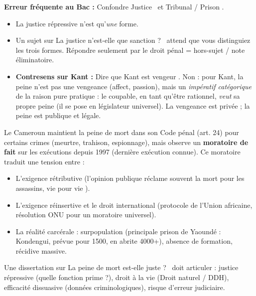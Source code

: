 \documentclass[11pt]{article}
\begin{document}
\begin{attention}
\textbf{Erreur fréquente au Bac :} Confondre \guillemotleft Justice \guillemotright\ et \guillemotleft Tribunal / Prison \guillemotright.
\begin{itemize}
    \item La justice répressive n'est qu'\emph{une} forme.
    \item Un sujet sur \guillemotleft La justice n'est-elle que sanction ? \guillemotright\ attend que vous distinguiez les trois formes. Répondre seulement par le droit pénal = hors-sujet / note éliminatoire.
    \item \textbf{Contresens sur Kant :} Dire que Kant est \guillemotleft vengeur \guillemotright. Non : pour Kant, la peine n'est pas une vengeance (affect, passion), mais un \emph{impératif catégorique} de la raison pure pratique : le coupable, en tant qu'être rationnel, \emph{veut} sa propre peine (il se pose en législateur universel). La vengeance est privée ; la peine est publique et légale.
\end{itemize}
\end{attention}

\begin{exemplebox}
Le Cameroun maintient la peine de mort dans son Code pénal (art. 24) pour certains crimes (meurtre, trahison, espionnage), mais observe un \textbf{moratoire de fait} sur les exécutions depuis 1997 (dernière exécution connue). Ce moratoire traduit une tension entre :
\begin{itemize}
    \item L'exigence rétributive (l'opinion publique réclame souvent la mort pour les assassins, \guillemotleft vie pour vie \guillemotright).
    \item L'exigence réinsertive et le droit international (protocole de l'Union africaine, résolution ONU pour un moratoire universel).
    \item La réalité carcérale : surpopulation (principale prison de Yaoundé : Kondengui, prévue pour 1500, en abrite 4000+), absence de formation, récidive massive.
\end{itemize}
Une dissertation sur \guillemotleft La peine de mort est-elle juste ? \guillemotright\ doit articuler : justice répressive (quelle fonction prime ?), droit à la vie (Droit naturel / DDH), efficacité dissuasive (données criminologiques), risque d'erreur judiciaire.
\end{exemplebox}
\end{document}
